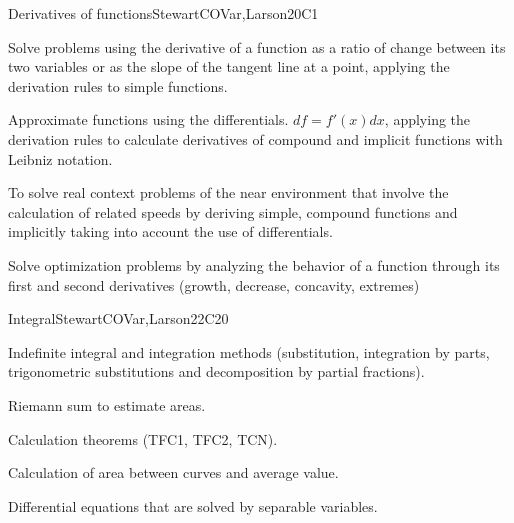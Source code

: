 \begin{syllabus}
\begin{unit}{Derivatives of functions}{}{StewartCOVar,Larson}{20}{C1}
   \begin{learningoutcomes}
      \item Solve problems using the derivative of a function as a ratio of change between its two variables or as the slope of the tangent line at a point, applying the derivation rules to simple functions.
      \item Approximate functions using the differentials. $df=f'(x)dx$, applying the derivation rules to calculate derivatives of compound and implicit functions with Leibniz notation.
      \item To solve real context problems of the near environment that involve the calculation of related speeds by deriving simple, compound functions and implicitly taking into account the use of differentials.
      \item Solve optimization problems by analyzing the behavior of a function through its first and second derivatives (growth, decrease, concavity, extremes)
   \end{learningoutcomes}
\end{unit}

\begin{unit}{Integral}{}{StewartCOVar,Larson}{22}{C20}
   \begin{topics}
      \item Indefinite integral and integration methods (substitution, integration by parts, trigonometric substitutions and decomposition by partial fractions).
      \item Riemann sum to estimate areas.
      \item Calculation theorems (TFC1, TFC2, TCN).
      \item Calculation of area between curves and average value.
      \item Differential equations that are solved by separable variables.
   \end{topics}


\end{unit}
\end{syllabus}
